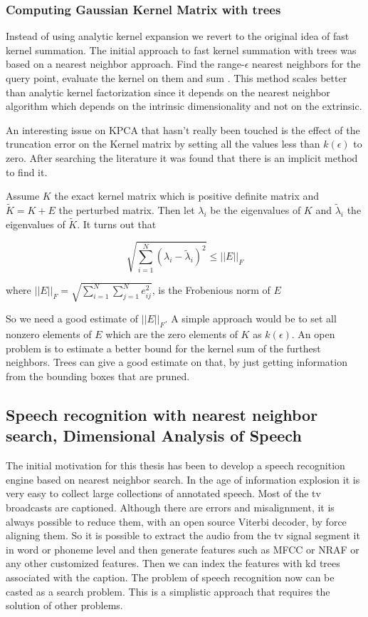 \documentclass[12pt,letterpaper,doublespaced,ETD,dvips,proposal]{gtthesis}
\begin{document}
\begin{Body}
\subsubsection{Computing Gaussian Kernel Matrix with trees}
Instead of using analytic kernel expansion we revert to the original
idea of fast kernel summation. The initial approach to fast kernel
summation with trees was based on a nearest neighbor approach. Find
the range-$\epsilon$ nearest neighbors for the query point, evaluate
the kernel on them and sum \cite{gray2003rem}. This method scales better than analytic
kernel factorization since it depends on the nearest neighbor
algorithm which depends on the intrinsic dimensionality and not on
the extrinsic.

An interesting issue on KPCA that hasn't really been touched is the
effect of the truncation error on the Kernel matrix by setting all
the values less than $k(\epsilon)$ to zero. After searching the
literature it was found that there is an implicit method to find it.

Assume $K$ the exact kernel matrix which is positive definite matrix
and $\tilde{K}=K+E$ the perturbed matrix. Then let $\lambda_i$ be
the eigenvalues of $K$ and $\tilde{\lambda}_i$ the eigenvalues of
$\tilde{K}$. It turns out \cite{stewart1990mpt} that

\begin{equation}
\sqrt{\sum_{i=1}^{N}(\lambda_i-\tilde{\lambda}_i)^2}\leq ||E||_F
\end{equation}

where $||E||_F=\sqrt{\sum_{i=1}^{N}\sum_{j=1}^{N}e_{ij}^2}$, is the
Frobenious norm of $E$

So we need a good estimate of $||E||_F$. A simple approach would be
to set all nonzero elements of $E$ which are the zero elements of
$K$ as $k(\epsilon)$.  An open problem is to estimate a better bound
for the kernel sum of the furthest neighbors. Trees can give  a good
estimate on that, by just getting information from the bounding
boxes that are pruned.


\subsection{Speech recognition with nearest neighbor search, Dimensional Analysis of Speech}
The initial motivation for this thesis has been to develop a speech recognition engine based on nearest neighbor search. In the age of information explosion it is very easy to collect large collections of annotated speech. Most of the tv broadcasts are captioned. Although there are errors and misalignment, it is always possible to reduce them, with an open source Viterbi decoder, by force aligning them. So it is possible to extract the audio from the tv signal segment it in word or phoneme level and then generate features such as MFCC or NRAF or any other customized features. Then we can index the features with kd trees associated with the caption. The problem of speech recognition now can be casted as a search problem. This is a simplistic approach that requires the solution of other problems. 


\end{Body}
\end{document}
